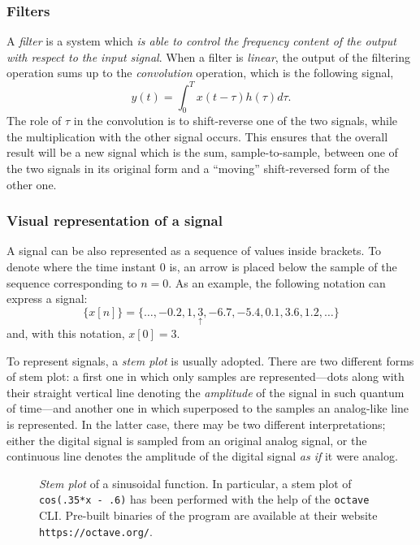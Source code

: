 \documentclass[\documentfontsize, twocolumn]{\classname}
\begin{document}
\subsubsection{Filters}

A \emph{filter} is a system which \emph{is able to control the frequency
content of the output with respect to the input signal}. When a filter is
\emph{linear}, the output of the filtering operation sums up to the
\emph{convolution} operation, which is the following signal,
\[
y(t) = \int_0^T x(t - \tau)h(\tau)d\tau.
\]
The role of $\tau$ in the convolution is to shift-reverse one of the two
signals, while the multiplication with the other signal occurs. This ensures
that the overall result will be a new signal which is the sum,
sample-to-sample, between one of the two signals in its original form and a
``moving'' shift-reversed form of the other one.

\subsubsection{Visual representation of a signal}

A signal can be also represented as a se\-quen\-ce of values inside brackets. To
denote where the time instant $0$ is, an arrow is placed below the sample of the
se\-quen\-ce corresponding to $n=0$. As an example, the following notation can express a signal:
\[ \{x[n]\} = \{\dots, -0.2,1,\underset{\uparrow}{3},-6.7,-5.4,0.1,3.6,1.2,\dots\}\] and, with this notation, $x[0]=3$.

To represent signals, a \emph{stem plot} is usually adopted. There are two
different forms of stem plot: a first one in which only samples are
represented---dots along with their straight vertical line denoting the
\emph{amplitude} of the signal in such quantum of time---and another one in
which superposed to the samples an analog-like line is represented. In the
latter case, there may be two different interpretations; either the digital
signal is sampled from an original analog signal, or the continuous line
denotes the amplitude of the digital signal \emph{as if} it were analog.

\begin{figure}[ht]
\begin{center}
\scalebox{0.6}{

}\caption{\emph{Stem plot} of a sinusoidal function. In particular, a stem plot of \texttt{cos(.35*x - .6)} has been performed with the help of the \texttt{octave} CLI. Pre-built binaries of the program are available at their website \texttt{https://octave.org/}.}\label{oct:stemPlot}
\end{center}
\end{figure}
\end{document}
